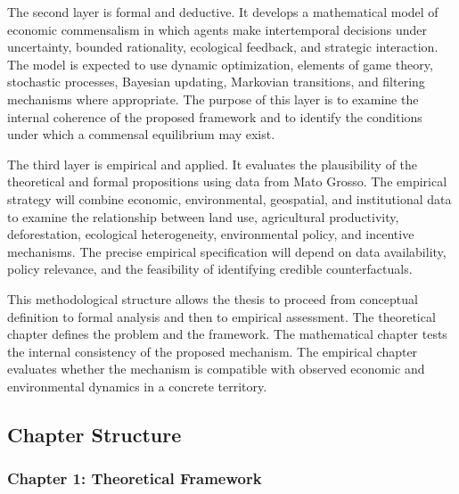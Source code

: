 The second layer is formal and deductive. It develops a mathematical model of economic commensalism in which agents make intertemporal decisions under uncertainty, bounded rationality, ecological feedback, and strategic interaction. The model is expected to use dynamic optimization, elements of game theory, stochastic processes, Bayesian updating, Markovian transitions, and filtering mechanisms where appropriate. The purpose of this layer is to examine the internal coherence of the proposed framework and to identify the conditions under which a commensal equilibrium may exist.

The third layer is empirical and applied. It evaluates the plausibility of the theoretical and formal propositions using data from Mato Grosso. The empirical strategy will combine economic, environmental, geospatial, and institutional data to examine the relationship between land use, agricultural productivity, deforestation, ecological heterogeneity, environmental policy, and incentive mechanisms. The precise empirical specification will depend on data availability, policy relevance, and the feasibility of identifying credible counterfactuals.

This methodological structure allows the thesis to proceed from conceptual definition to formal analysis and then to empirical assessment. The theoretical chapter defines the problem and the framework. The mathematical chapter tests the internal consistency of the proposed mechanism. The empirical chapter evaluates whether the mechanism is compatible with observed economic and environmental dynamics in a concrete territory.

\subsection{Chapter Structure}

\subsubsection{Chapter 1: Theoretical Framework}

